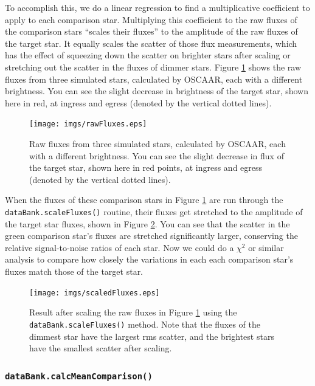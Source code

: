 \documentclass[a4paper]{article}
\newcommand{\code}[1]{\texttt{#1}}
\begin{document}
To accomplish this, we do a linear regression to find a multiplicative coefficient to apply to each comparison star. Multiplying this coefficient to the raw fluxes of the comparison stars ``scales their fluxes'' to the amplitude of the raw fluxes of the target star. It equally scales the scatter of those flux measurements, which has the effect of squeezing down the scatter on brighter stars after scaling or stretching out the scatter in the fluxes of dimmer 
stars. Figure \ref{fig:rawFluxes} shows the raw fluxes from three simulated stars, calculated by OSCAAR, each with a different brightness. You can see the slight decrease in brightness of the target star, shown here in red, at ingress and egress (denoted by the vertical dotted lines). 
\begin{figure}[H]
\begin{center}
\texttt{[image: imgs/rawFluxes.eps]}
\caption{Raw fluxes from three simulated stars, calculated by OSCAAR, each with a different brightness. You can see the slight decrease in flux of the target star, shown here in red points, at ingress and egress (denoted by the vertical dotted lines).}
\label{fig:rawFluxes}
\end{center}	
\end{figure}

\noindent When the fluxes of these comparison stars in Figure \ref{fig:rawFluxes} are run through the \code{dataBank.scaleFluxes()} routine, their fluxes get stretched to the amplitude of the target star fluxes, shown in Figure \ref{fig:scaledFluxes}. You can see that the scatter in the green comparison star's fluxes are stretched significantly larger, conserving the relative signal-to-noise ratios of each star. Now we could do a $\chi^2$ or similar analysis to compare how closely the variations in each each comparison star's fluxes match those of the target star. 

\begin{figure}[H]
\begin{center}
\texttt{[image: imgs/scaledFluxes.eps]}
\caption{Result after scaling the raw fluxes in Figure \ref{fig:rawFluxes} using the \code{dataBank.scaleFluxes()} method. Note that the fluxes of the dimmest star have the largest rms scatter, and the brightest stars have the smallest scatter after scaling.}
\label{fig:scaledFluxes}
\end{center}	
\end{figure}


\subsubsection{\code{dataBank.calcMeanComparison()}} \label{sec:calcMeanComp}
\end{document}
